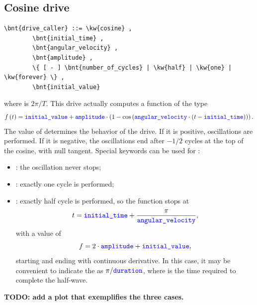 \subsection{Cosine drive}
\begin{Verbatim}[commandchars=\\\{\}]
    \bnt{drive_caller} ::= \kw{cosine} ,
        \bnt{initial_time} ,
        \bnt{angular_velocity} ,
        \bnt{amplitude} ,
        \{ [ - ] \bnt{number_of_cycles} | \kw{half} | \kw{one} | \kw{forever} \} , 
        \bnt{initial_value}
\end{Verbatim}
where  is $2\pi/T$.
This drive actually computes a function of the type
\begin{displaymath}
	f\left( t \right) = \textcolor{blue}{\texttt{initial\_value}} + \textcolor{blue}{\texttt{amplitude}} \cdot \left( 
		1 - \mathrm{cos}\left( 
			\textcolor{blue}{\texttt{angular\_velocity}} \cdot \left( 
				t - \textcolor{blue}{\texttt{initial\_time}}
			 \right)
		 \right)
	 \right) .
\end{displaymath}
The value of  determines the behavior of the
drive. 
If it is positive,  oscillations are performed.
If it is negative, the oscillations end after
$-1/2$ cycles at the top of the cosine, with null
tangent.   
Special keywords can be used for :
\begin{itemize}
	\item {}: the oscillation never stops;
	\item {}: exactly one cycle is performed;
	\item {}: exactly half cycle is performed,
	so the function stops at
	\begin{displaymath}
		t = \textcolor{blue}{\texttt{initial\_time}} + \frac{\pi}{\textcolor{blue}{\texttt{angular\_velocity}}} ,
	\end{displaymath}
	with a value of
	\begin{displaymath}
		f = 2 \cdot \textcolor{blue}{\texttt{amplitude}} + \textcolor{blue}{\texttt{initial\_value}} ,
	\end{displaymath}
	starting and ending with continuous derivative.
	In this case, it may be convenient to indicate the 
	as $\pi/\textcolor{blue}{\texttt{duration}}$, where  is the time
	required to complete the half-wave.
\end{itemize}

\textbf{TODO: add a plot that exemplifies the three cases.}

